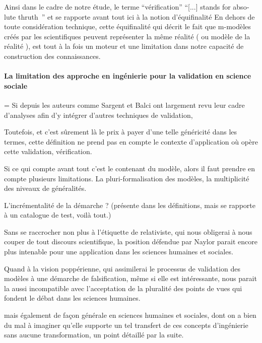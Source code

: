 Ainsi dans le cadre de notre étude, le terme \enquote{vérification}  \foreignquote{english}{[...] stands for absolute thruth } \autocite{David2009} \autocite{Oreskes1994} et se rapporte avant tout ici à la notion d'équifinalité \autocite{OSullivan2004} En dehors de toute considération technique, cette équifinalité qui décrit le fait que m-modèles créés par les scientifiques peuvent représenter la même réalité ( ou modèle de la réalité ), est tout à la fois un moteur et une limitation dans notre capacité de construction des connaissances. 


\paragraph{La limitation des approche en ingénierie pour la validation en science sociale}

= Si depuis les auteurs comme Sargent et Balci ont largement revu leur cadre d'analyses afin d'y intégrer d'autres techniques de validation, 

Toutefois, et c'est sûrement là le prix à payer d'une telle généricité dans les termes, cette définition ne prend pas en compte le contexte d'application où opère cette validation, vérification. 

Si ce qui compte avant tout c'est le contenant du modèle, alors il faut prendre en compte plusieurs limitations. La pluri-formalisation des modèles, la multiplicité des niveaux de généralités.

L'incrémentalité de la démarche ? (présente dans les définitions, mais se rapporte à un catalogue de test, voilà tout.)

Sans se raccrocher non plus à l'étiquette de relativiste, qui nous obligerai à nous couper de tout discours scientifique, la position défendue par Naylor parait encore plus intenable pour une application dans les sciences humaines et sociales.

Quand à la vision poppérienne, qui assimilerai le processus de validation des modèles à une démarche de falsification, même si elle est intéressante, nous parait la aussi incompatible avec l'acceptation de la pluralité des points de vues qui fondent le débat dans les sciences humaines.


mais également de façon générale en sciences humaines et sociales, dont on a bien du mal à imaginer qu'elle supporte un tel transfert de ces concepts d’ingénierie sans aucune transformation, un point détaillé par la suite.




